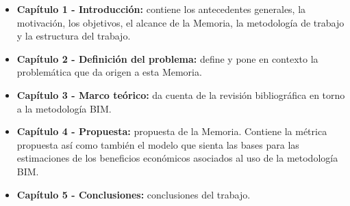 \begin{itemize}
    \item \textbf{Capítulo 1 - Introducción:} contiene los antecedentes generales, la motivación, los objetivos, el alcance de la Memoria, la metodología de trabajo y la estructura del trabajo.
    \item \textbf{Capítulo 2 - Definición del problema:} define y pone en contexto la problemática que da origen a esta Memoria.
    \item \textbf{Capítulo 3 - Marco teórico:} da cuenta de la revisión bibliográfica en torno a la metodología BIM.
    \item \textbf{Capítulo 4 - Propuesta:} propuesta de la Memoria. Contiene la métrica propuesta así como también el modelo que sienta las bases para las estimaciones de los beneficios económicos asociados al uso de la metodología BIM.
    \item \textbf{Capítulo 5 - Conclusiones:} conclusiones del trabajo.
\end{itemize}
